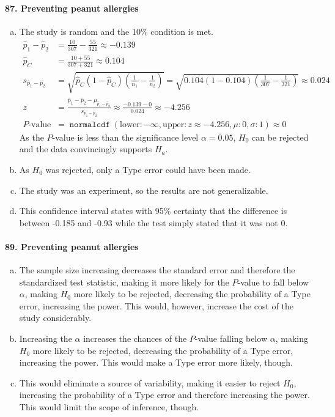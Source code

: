 \documentclass[12pt, A4]{article}
\DeclareMathOperator{\normalcdf}{\texttt{normalcdf}}
\newcommand{\normalCDF}[4]{\normalcdf\left(\mathrm{lower}: #1, \mathrm{upper}: #2, \mu: #3, \sigma: #4\right)}
\newcommand{\propsee}[3]{\sqrt{#1\left(1 - #1\right)\left(\frac{1}{#2} - \frac{1}{#3}\right)}}
\newcommand{\z}[3]{\frac{#1 - #2}{#3}}
\renewcommand{\Roman}[1]{\MakeUppercase{\romannumeral #1}}
\begin{document}
			\paragraph{87. Preventing peanut allergies}
				\begin{enumerate}[a.]
					\item
						The study is random and the 10\% condition is met.
						\begin{align*}
							\hat{p}_1 - \hat{p}_2 &= \frac{10}{307} - \frac{55}{321} \approx -0.139 \\
							\hat{p}_C &= \frac{10 + 55}{307 + 321} \approx  0.104 \\
							s_{\hat{p}_1 - \hat{p}_2} &= \propsee{\hat{p}_C}{n_1}{n_2} = \propsee{0.104}{307}{321} \approx 0.024 \\
							z &= \z{\hat{p}_1 - \hat{p}_2}{\mu_{\hat{p}_1 - \hat{p}_2}}{s_{\hat{p}_1 - \hat{p}_2}} \approx \z{-0.139}{0}{0.024} \approx -4.256 \\
							P\text{-value} &= \normalCDF{-\infty}{z \approx -4.256}{0}{1} \approx 0
						\end{align*}
						As the $P$-value is less than the significance level $\alpha = 0.05$, $H_0$ can be rejected and the data convincingly supports $H_a$.
					\item
						As $H_0$ was rejected, only a Type \Roman{2} error could have been made.
					\item
						The study was an experiment, so the results are not generalizable.
					\item
						This confidence interval states with 95\% certainty that the difference is between -0.185 and -0.93 while the test simply stated that it was not 0.
				\end{enumerate}
			\paragraph{89. Preventing peanut allergies}
				\begin{enumerate}[a.]
					\item
						The sample size increasing decreases the standard error and therefore the standardized test statistic, making it more likely for the $P$-value to fall below $\alpha$, making $H_0$ more likely to be rejected, decreasing the probability of a Type \Roman{2} error, increasing the power. This would, however, increase the cost of the study considerably.
					\item
						Increasing the $\alpha$ increases the chances of the $P$-value falling below $\alpha$, making $H_0$ more likely to be rejected, decreasing the probability of a Type \Roman{2} error, increasing the power. This would make a Type \Roman{1} error more likely, though.
					\item
						This would eliminate a source of variability, making it easier to reject $H_0$, increasing the probability of a Type \Roman{2} error and therefore increasing the power. This would limit the scope of inference, though.
				\end{enumerate}
\end{document}
